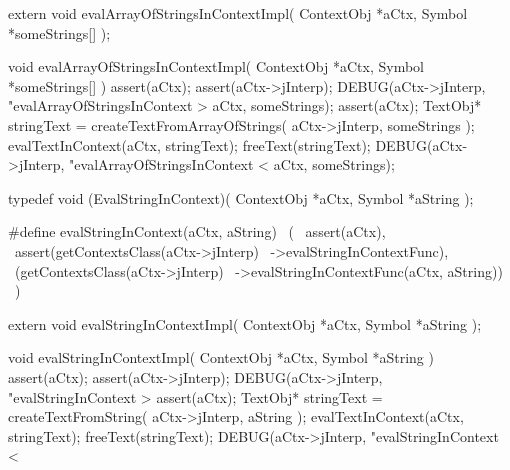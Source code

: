 \startCHeader
extern void evalArrayOfStringsInContextImpl(
  ContextObj *aCtx,
  Symbol     *someStrings[]
);
\stopCHeader
{}

\startCCode
void evalArrayOfStringsInContextImpl(
  ContextObj *aCtx,
  Symbol     *someStrings[]
) {
  assert(aCtx);
  assert(aCtx->jInterp);
  DEBUG(aCtx->jInterp, "evalArrayOfStringsInContext > %
    aCtx, someStrings);
  assert(aCtx);
  TextObj* stringText =
    createTextFromArrayOfStrings(
      aCtx->jInterp,
      someStrings
    );
  evalTextInContext(aCtx, stringText);
  freeText(stringText);
  DEBUG(aCtx->jInterp, "evalArrayOfStringsInContext < %
    aCtx, someStrings);
}
\stopCCode

\startCHeader
typedef void (EvalStringInContext)(
  ContextObj *aCtx,
  Symbol     *aString
);

#define evalStringInContext(aCtx, aString)      \
  (                                             \
    assert(aCtx),                               \
    assert(getContextsClass(aCtx->jInterp)      \
      ->evalStringInContextFunc),               \
    (getContextsClass(aCtx->jInterp)            \
      ->evalStringInContextFunc(aCtx, aString)) \
  )
\stopCHeader

\setCHeaderStream{private}
\startCHeader
extern void evalStringInContextImpl(
  ContextObj *aCtx,
  Symbol     *aString
);
\stopCHeader
\setCHeaderStream{public}

\startCCode
void evalStringInContextImpl(
  ContextObj *aCtx,
  Symbol     *aString
) {
  assert(aCtx);
  assert(aCtx->jInterp);
  DEBUG(aCtx->jInterp, "evalStringInContext > %
  assert(aCtx);
  TextObj* stringText =
    createTextFromString(
      aCtx->jInterp,
      aString
    );
  evalTextInContext(aCtx, stringText);
  freeText(stringText);
  DEBUG(aCtx->jInterp, "evalStringInContext < %
}
\stopCCode